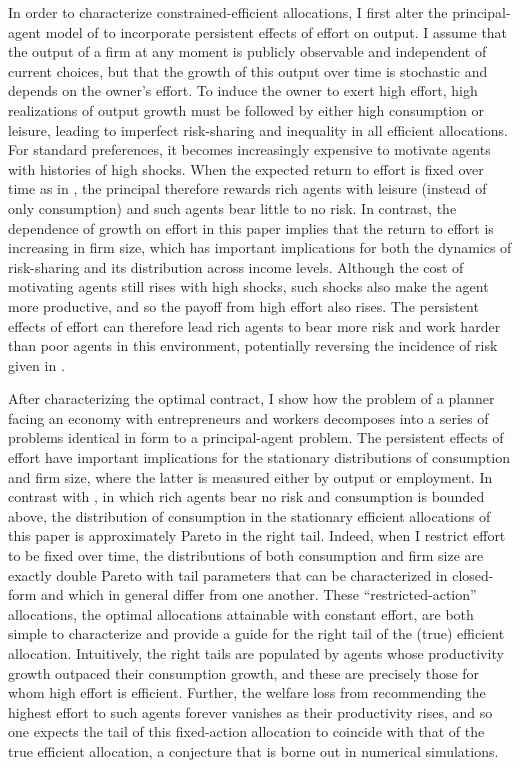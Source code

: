 \documentclass[11pt]{article}
\theoremstyle{plain}
\begin{document}
In order to characterize constrained-efficient allocations, I first alter the principal-agent model of \cite{sannikov_continuous-time_2008} to incorporate persistent effects of effort on output. I assume that the output of a firm at any moment is publicly observable and independent of current choices, but that the growth of this output over time is stochastic and depends on the owner's effort. To induce the owner to exert high effort, high realizations of output growth must be followed by either high consumption or leisure, leading to imperfect risk-sharing and inequality in all efficient allocations. For standard preferences, it becomes increasingly expensive to motivate agents with histories of high shocks. When the expected return to effort is fixed over time as in \cite{sannikov_continuous-time_2008}, the principal therefore rewards rich agents with leisure (instead of only consumption) and such agents bear little to no risk. In contrast, the dependence of growth on effort in this paper implies that the return to effort is increasing in firm size, which has important implications for both the dynamics of risk-sharing and its distribution across income levels. Although the cost of motivating agents still rises with high shocks, such shocks also make the agent more productive, and so the payoff from high effort also rises. The persistent effects of effort can therefore lead rich agents to bear more risk and work harder than poor agents in this environment, potentially reversing the incidence of risk given in \cite{sannikov_continuous-time_2008}.

 
After characterizing the optimal contract, I show how the problem of a planner facing an economy with entrepreneurs and workers decomposes into a series of problems identical in form to a principal-agent problem. The persistent effects of effort have important implications for the stationary distributions of consumption and firm size, where the latter is measured either by output or employment. In contrast with \cite{sannikov_continuous-time_2008}, in which rich agents bear no risk and consumption is bounded above, the distribution of consumption in the stationary efficient allocations of this paper is approximately Pareto in the right tail. Indeed, when I restrict effort to be fixed over time, the distributions of both consumption and firm size are exactly double Pareto with tail parameters that can be characterized in closed-form and which in general differ from one another. These ``restricted-action'' allocations, the optimal allocations attainable with constant effort, are both simple to characterize and provide a guide for the right tail of the (true) efficient allocation. Intuitively, the right tails are populated by agents whose productivity growth outpaced their consumption growth, and these are precisely those for whom high effort is efficient. Further, the welfare loss from recommending the highest effort to such agents forever vanishes as their productivity rises, and so one expects the tail of this fixed-action allocation to coincide with that of the true efficient allocation, a conjecture that is borne out in numerical simulations. 
\end{document}
